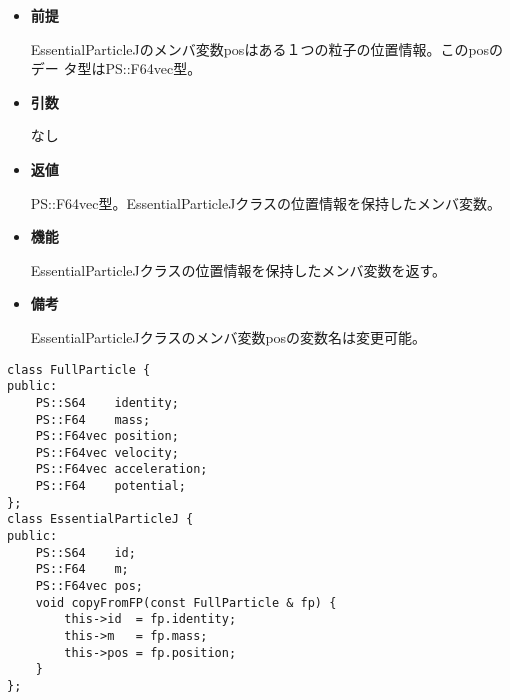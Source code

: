 \begin{itemize}

\item {\bf 前提}
  
  EssentialParticleJのメンバ変数posはある１つの粒子の位置情報。このposのデー
  タ型はPS::F64vec型。
  
\item {\bf 引数}

  なし
  
\item {\bf 返値}

  PS::F64vec型。EssentialParticleJクラスの位置情報を保持したメンバ変数。
  
\item {\bf 機能}

  EssentialParticleJクラスの位置情報を保持したメンバ変数を返す。
  
\item {\bf 備考}

  EssentialParticleJクラスのメンバ変数posの変数名は変更可能。

\end{itemize}


\begin{screen}
\begin{verbatim}
class FullParticle {
public:
    PS::S64    identity;
    PS::F64    mass;
    PS::F64vec position;
    PS::F64vec velocity;
    PS::F64vec acceleration;
    PS::F64    potential;
};
class EssentialParticleJ {
public:
    PS::S64    id;
    PS::F64    m;
    PS::F64vec pos;
    void copyFromFP(const FullParticle & fp) {
        this->id  = fp.identity;
        this->m   = fp.mass;
        this->pos = fp.position;
    }
};
\end{verbatim}
\end{screen}

